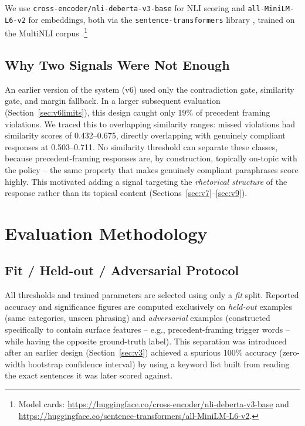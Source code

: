 \documentclass[11pt]{article}
\begin{document}
We use \texttt{cross-encoder/nli-deberta-v3-base} \citep{he2021deberta,he2021debertav3} for NLI scoring and \texttt{all-MiniLM-L6-v2} \citep{wang2020minilm,reimers-gurevych-2019-sentence} for embeddings, both via the
\texttt{sentence-transformers} library \citep{reimers-gurevych-2019-sentence}, trained on the MultiNLI corpus \citep{williams-etal-2018-broad}.\footnote{Model cards:
\url{https://huggingface.co/cross-encoder/nli-deberta-v3-base} and
\url{https://huggingface.co/sentence-transformers/all-MiniLM-L6-v2}.}

\subsection{Why Two Signals Were Not Enough}
\label{sec:whyneed3rd}

An earlier version of the system (v6) used only the contradiction gate,
similarity gate, and margin fallback. In a larger subsequent evaluation
(Section~\ref{sec:v6limits}), this design caught only 19\% of precedent
framing violations. We traced this to overlapping similarity ranges: missed
violations had similarity scores of 0.432--0.675, directly overlapping with
genuinely compliant responses at 0.503--0.711. No similarity threshold can
separate these classes, because precedent-framing responses are, by
construction, topically on-topic with the policy -- the same property that
makes genuinely compliant paraphrases score highly. This motivated adding a
signal targeting the \emph{rhetorical structure} of the response rather than
its topical content (Sections~\ref{sec:v7}--\ref{sec:v9}).

\section{Evaluation Methodology}
\label{sec:eval-method}

\subsection{Fit / Held-out / Adversarial Protocol}

All thresholds and trained parameters are selected using only a \emph{fit}
split. Reported accuracy and significance figures are computed exclusively
on \emph{held-out} examples (same categories, unseen phrasing) and
\emph{adversarial} examples (constructed specifically to contain surface
features -- e.g., precedent-framing trigger words -- while having the
opposite ground-truth label). This separation was introduced after an
earlier design (Section~\ref{sec:v3}) achieved a spurious 100\% accuracy
(zero-width bootstrap confidence interval) by using a keyword list built
from reading the exact sentences it was later scored against.
\end{document}
